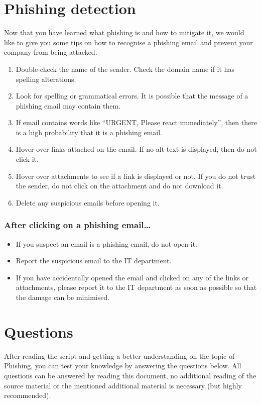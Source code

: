 \chapter{Phishing detection}
Now that you have learned what phishing is and how to mitigate it, we would like to give you some tips on how to recognise a phishing email and prevent your company from being attacked.
\begin{enumerate}
    \item Double-check the name of the sender. Check the domain name if it has spelling alterations.
    \item Look for spelling or grammatical errors. It is possible that the message of a phishing email may contain them.
    \item If email contains words like \enquote{URGENT, Please react immediately}, then there is a high probability that it is a phishing email.
    \item Hover over links attached on the email. If no alt text is displayed, then do not click it.
    \item Hover over attachments to see if a link is displayed or not. If you do not trust the sender, do not click on the attachment and do not download it.
    \item Delete any suspicious emails before opening it. \\
\end{enumerate}

\subsection{After clicking on a phishing email\dots}
\begin{itemize}
    \item If you suspect an email is a phishing email, do not open it.
    \item Report the suspicious email to the IT department.
    \item If you have accidentally opened the email and clicked on any of the links or attachments, please report it to the IT department as soon as possible so that the damage can be minimised.
\end{itemize}

\chapter{Questions}
After reading the script and getting a better understanding on the topic of Phishing, you can test your knowledge by answering the 
 questions below. All questions can be answered by reading this document, no additional reading of the source material or the mentioned additional material is necessary (but highly recommended).

